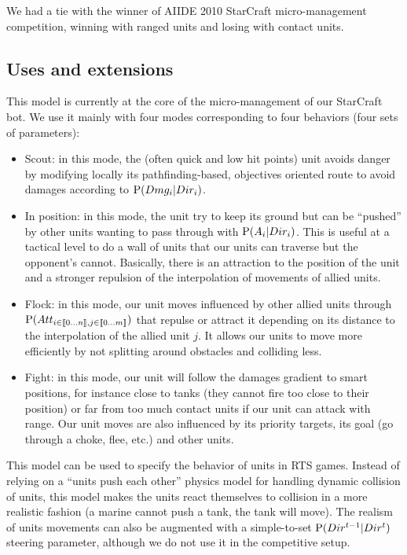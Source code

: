 We had a tie with the winner of AIIDE 2010 StarCraft micro-management competition, winning with ranged units and losing with contact units. %

\subsection{Uses and extensions}
This model is currently at the core of the micro-management of our StarCraft bot. We use it mainly with four modes corresponding to four behaviors (four sets of parameters):
\begin{itemize}
\item Scout: in this mode, the (often quick and low hit points) unit avoids danger by modifying locally its pathfinding-based, objectives oriented route to avoid damages according to $\mathrm{P}(Dmg_i|Dir_i)$.
\item In position: in this mode, the unit try to keep its ground but can be ``pushed'' by other units wanting to pass through with $\mathrm{P}(A_i | Dir_i)$. This is useful at a tactical level to do a wall of units that our units can traverse but the opponent's cannot. Basically, there is an attraction to the position of the unit and a stronger repulsion of the interpolation of movements of allied units.
\item Flock: in this mode, our unit moves influenced by other allied units through $\mathrm{P}(Att_{i \in \llbracket 0 \dots n\rrbracket, j \in \llbracket 0 \dots m \rrbracket})$ that repulse or attract it depending on its distance to the interpolation of the allied unit $j$. It allows our units to move more efficiently by not splitting around obstacles and colliding less.
\item Fight: in this mode, our unit will follow the damages gradient to smart positions, for instance close to tanks (they cannot fire too close to their position) or far from too much contact units if our unit can attack with range. Our unit moves are also influenced by its priority targets, its goal (go through a choke, flee, etc.) and other units.
\end{itemize}

This model can be used to specify the behavior of units in RTS games. Instead of relying on a ``units push each other'' physics model for handling dynamic collision of units, this model makes the units react themselves to collision in a more realistic fashion (a marine cannot push a tank, the tank will move). The realism of units movements can also be augmented with a simple-to-set $\mathrm{P}(Dir^{t-1}|Dir^t)$ steering parameter, although we do not use it in the competitive setup.



